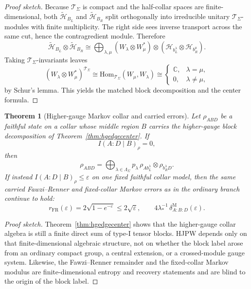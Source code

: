 \documentclass[11pt]{article}
\newtheorem{theorem}{Theorem}[section]
\begin{document}
\begin{proof}[Proof sketch]
Because \(\mathcal T_\Sigma\) is compact and the half-collar spaces are finite-dimensional, both \(\widetilde{\mathcal H}_{B_L}\) and \(\widetilde{\mathcal H}_{B_R}\) split orthogonally into irreducible unitary \(\mathcal T_\Sigma\)-modules with finite multiplicity. The right side sees inverse transport across the same cut, hence the contragredient module. Therefore
\[
\widetilde{\mathcal H}_{B_L}\otimes \widetilde{\mathcal H}_{B_R}
\cong
\bigoplus_{\lambda,\mu}
(W_\lambda\otimes W_\mu^*)\otimes
(\mathcal H_{b_L^\lambda}\otimes \mathcal H_{b_R^\mu}).
\]
Taking \(\mathcal T_\Sigma\)-invariants leaves
\[
(W_\lambda\otimes W_\mu^*)^{\mathcal T_\Sigma}
\cong
\mathrm{Hom}_{\mathcal T_\Sigma}(W_\mu,W_\lambda)
\cong
\begin{cases}
\mathbb C, & \lambda=\mu,\\
0, & \lambda\neq\mu,
\end{cases}
\]
by Schur's lemma. This yields the matched block decomposition and the center formula.
\end{proof}

\begin{theorem}[Higher-gauge Markov collar and carried errors]\label{thm:hgmarkov}
Let \(\rho_{ABD}\) be a faithful state on a collar whose middle region \(B\) carries the higher-gauge block decomposition of Theorem~\ref{thm:hgedgecenter}. If
\[
I(A:D\mid B)_\rho=0,
\]
then
\[
\rho_{ABD}
=
\bigoplus_{\lambda\in\Lambda_\Sigma}
p_\lambda\,
\rho_{A b_L^\lambda}\otimes \rho_{b_R^\lambda D}.
\]
If instead \(I(A:D\mid B)_\rho\le \varepsilon\) on one fixed faithful collar model, then the same carried Fawzi--Renner and fixed-collar Markov errors as in the ordinary branch continue to hold:
\[
r_{\mathrm{FR}}(\varepsilon)=2\sqrt{1-e^{-\varepsilon}}\le 2\sqrt{\varepsilon},
\qquad
4\lambda_\ast^{-1}\,\delta^{\mathrm M}_{A:B:D}(\varepsilon).
\]
\end{theorem}

\begin{proof}[Proof sketch]
Theorem~\ref{thm:hgedgecenter} shows that the higher-gauge collar algebra is still a finite direct sum of type-I tensor blocks. HJPW depends only on that finite-dimensional algebraic structure, not on whether the block label arose from an ordinary compact group, a central extension, or a crossed-module gauge system. Likewise, the Fawzi--Renner remainder and the fixed-collar Markov modulus are finite-dimensional entropy and recovery statements and are blind to the origin of the block label.
\end{proof}
\end{document}
